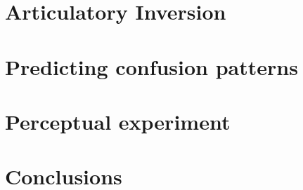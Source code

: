 









\section{Articulatory Inversion}


\section{Predicting confusion patterns}


\section{Perceptual experiment}

\section{Conclusions}




